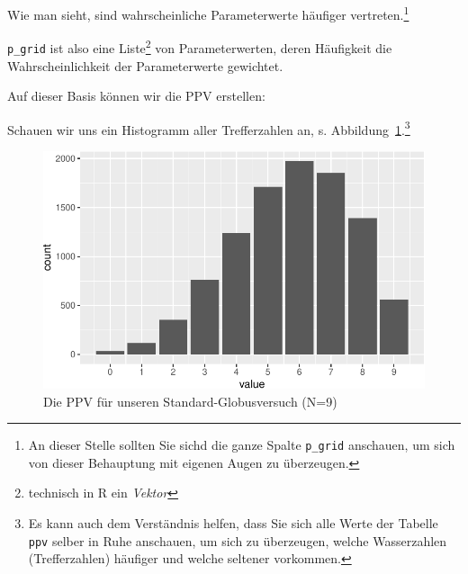 \documentclass[
  a4paper,
  DIV=11]{scrreprt}
\newenvironment{Shaded}{\begin{snugshade}}{\end{snugshade}}
\newcommand{\AttributeTok}[1]{\textcolor[rgb]{0.40,0.45,0.13}{#1}}
\newcommand{\DecValTok}[1]{\textcolor[rgb]{0.68,0.00,0.00}{#1}}
\newcommand{\DocumentationTok}[1]{\textcolor[rgb]{0.37,0.37,0.37}{\textit{#1}}}
\newcommand{\FloatTok}[1]{\textcolor[rgb]{0.68,0.00,0.00}{#1}}
\newcommand{\FunctionTok}[1]{\textcolor[rgb]{0.28,0.35,0.67}{#1}}
\newcommand{\NormalTok}[1]{\textcolor[rgb]{0.00,0.23,0.31}{#1}}
\newcommand{\OtherTok}[1]{\textcolor[rgb]{0.00,0.23,0.31}{#1}}
\newcommand{\SpecialCharTok}[1]{\textcolor[rgb]{0.37,0.37,0.37}{#1}}
\theoremstyle{definition}
\theoremstyle{remark}
\begin{document}
Wie man sieht, sind wahrscheinliche Parameterwerte häufiger
vertreten.\footnote{An dieser Stelle sollten Sie sichd die ganze Spalte
  \texttt{p\_grid} anschauen, um sich von dieser Behauptung mit eigenen
  Augen zu überzeugen.}

\texttt{p\_grid} ist also eine Liste\footnote{technisch in R ein
  \emph{Vektor}} von Parameterwerten, deren Häufigkeit die
Wahrscheinlichkeit der Parameterwerte gewichtet.

Auf dieser Basis können wir die PPV erstellen:

\begin{Shaded}
\end{Shaded}

Schauen wir uns ein Histogramm aller Trefferzahlen an, s.
Abbildung~\ref{fig-ppv2}.\footnote{Es kann auch dem Verständnis helfen,
  dass Sie sich alle Werte der Tabelle \texttt{ppv} selber in Ruhe
  anschauen, um sich zu überzeugen, welche Wasserzahlen (Trefferzahlen)
  häufiger und welche seltener vorkommen.}

\begin{figure}

{\centering \includegraphics{./ppv_files/figure-pdf/fig-ppv2-1.pdf}

}

\caption{\label{fig-ppv2}Die PPV für unseren Standard-Globusversuch
(N=9)}

\end{figure}
\end{document}
